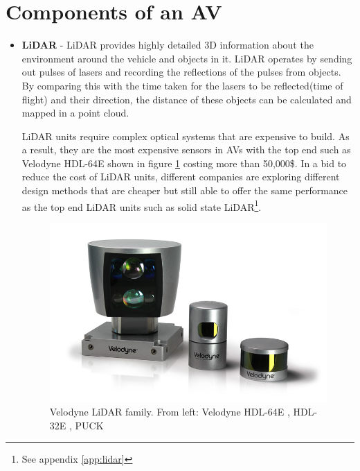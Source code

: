 
\section{Components of an AV}

\begin{itemize}
	\item \textbf{LiDAR} - LiDAR provides highly detailed 3D information about the environment around the vehicle and objects in it. LiDAR operates by sending out pulses of lasers and recording the reflections of the pulses from objects. By comparing this with the time taken for the lasers to be reflected(time of flight) and their direction, the distance of these objects can be calculated and mapped in a point cloud. 

	LiDAR units require complex optical systems that are expensive to build. As a result,  they are the most expensive sensors in AVs with the top end such as Velodyne HDL-64E shown in figure \ref{fig:lidar} costing more than 50,000\$. 
	In a bid to reduce the cost of LiDAR units,  different companies are exploring different design methods that are cheaper but still able to offer the same performance as the top end LiDAR units such as solid state LiDAR\footnote{See appendix \ref{app:lidar}}.
	
	 \begin{figure}[h]
	 	\centering
	 	\includegraphics[width=\textwidth]{media/hdl-family.png}
	 	\caption{Velodyne LiDAR family. From left: Velodyne HDL-64E , HDL-32E , PUCK}
	 	\label{fig:lidar}
	 \end{figure}
	

\end{itemize}
